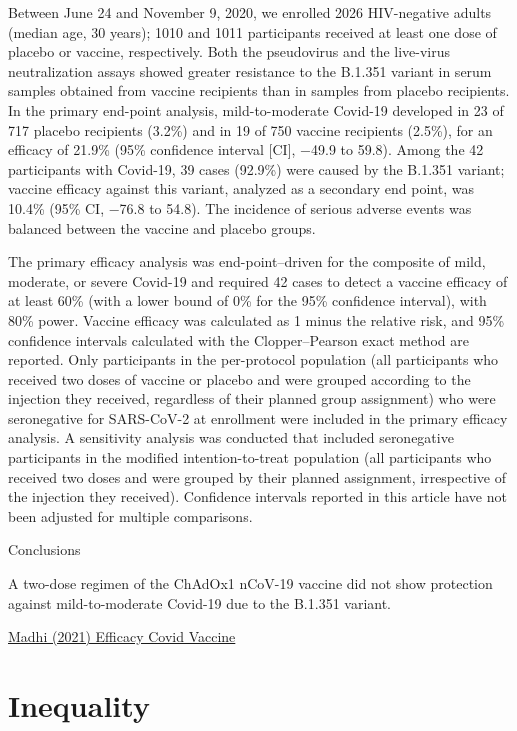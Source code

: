 \documentclass[
]{book}
\begin{document}
Between June 24 and November 9, 2020, we enrolled 2026 HIV-negative adults (median age, 30 years); 1010 and 1011 participants received at least one dose of placebo or vaccine, respectively. Both the pseudovirus and the live-virus neutralization assays showed greater resistance to the B.1.351 variant in serum samples obtained from vaccine recipients than in samples from placebo recipients. In the primary end-point analysis, mild-to-moderate Covid-19 developed in 23 of 717 placebo recipients (3.2\%) and in 19 of 750 vaccine recipients (2.5\%), for an efficacy of 21.9\% (95\% confidence interval {[}CI{]}, −49.9 to 59.8). Among the 42 participants with Covid-19, 39 cases (92.9\%) were caused by the B.1.351 variant; vaccine efficacy against this variant, analyzed as a secondary end point, was 10.4\% (95\% CI, −76.8 to 54.8). The incidence of serious adverse events was balanced between the vaccine and placebo groups.

The primary efficacy analysis was end-point--driven for the composite of mild, moderate, or severe Covid-19 and required 42 cases to detect a vaccine efficacy of at least 60\% (with a lower bound of 0\% for the 95\% confidence interval), with 80\% power. Vaccine efficacy was calculated as 1 minus the relative risk, and 95\% confidence intervals calculated with the Clopper--Pearson exact method are reported. Only participants in the per-protocol population (all participants who received two doses of vaccine or placebo and were grouped according to the injection they received, regardless of their planned group assignment) who were seronegative for SARS-CoV-2 at enrollment were included in the primary efficacy analysis. A sensitivity analysis was conducted that included seronegative participants in the modified intention-to-treat population (all participants who received two doses and were grouped by their planned assignment, irrespective of the injection they received). Confidence intervals reported in this article have not been adjusted for multiple comparisons.

Conclusions

A two-dose regimen of the ChAdOx1 nCoV-19 vaccine did not show protection against mild-to-moderate Covid-19 due to the B.1.351 variant.

\href{https://www.nejm.org/doi/10.1056/NEJMoa2102214\#.YFJIkr3ju7k.twitter}{Madhi (2021) Efficacy Covid Vaccine}

\hypertarget{inequality}{%
\chapter{Inequality}\label{inequality}}
\end{document}
